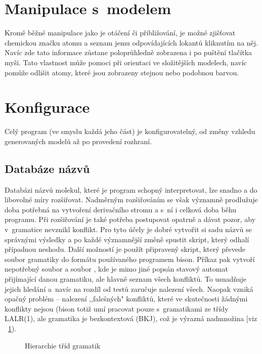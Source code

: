 \section{Manipulace s~modelem}
Kromě běžné manipulace jako je otáčení či přibližování, je možné zjišťovat chemickou
značku atomu a seznam jemu odpovídajících lokantů kliknutím na něj. Navíc
zde tato informace zůstane poloprůhledně zobrazena i po puštění tlačítka myši.
Tato vlastnost může pomoci při orientaci ve složitějších modelech, navíc pomůže
odlišit atomy, které jsou zobrazeny stejnou nebo podobnou barvou.

\section{Konfigurace}
Celý program (ve smyslu každá jeho část) je konfigurovatelný, od změny vzhledu
generovaných modelů až po provedení rozhraní.

\subsection{Databáze názvů}
Databázi názvů molekul, které je program schopný interpretovat, lze snadno a do
libovolné míry rozšiřovat. Nadměrným rozšiřováním se však významně prodlužuje
doba potřebná na vytvoření derivačního stromu a s~ní i celková doba běhu
programu. Při rozšiřování je také potřeba postupovat opatrně a dávat pozor, aby
v~gramatice nevznikl konflikt. Pro tyto účely je dobré vytvořit si sadu názvů
se správnými výsledky a po každé významnější změně spustit skript, který odhalí
případnou neshodu. Další možností je použít připravený skript, který převede
soubor gramatiky do formátu používaného programem bison. Příkaz
 pak vytvoří nepotřebný soubor
 a soubor , kde je mimo jiné
popsán stavový automat přijímající danou gramatiku, ale hlavně seznam všech
konfliktů. To usnadňuje jejich hledání a~navíc na rozdíl od testů zaručuje
nalezení všech. Naopak vzniká opačný problém -- nalezení ,,falešných" konfliktů,
které ve skutečnosti žádnými konflikty nejsou (bison totiž umí pracovat pouze
s~gramatikami ze třídy LALR(1), ale gramatika  je bezkontextová
(BKJ), což je výrazná nadmnožina [viz {\figurename}~\ref{pic:gramatiky}).

\begin{figure}[h]
	\caption{\label{pic:gramatiky}Hierarchie tříd gramatik \cite{Yaghob:pp}}
\end{figure}

